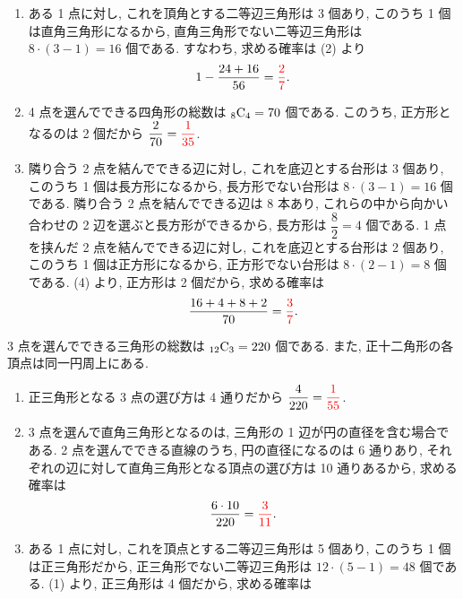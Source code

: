 \begin{qenumerate}
{\begin{enumerate}
{				\begin{align}
					\frac{4\cdot 6}{56} = \red{\frac{3}{7}}.
				\end{align}
			}
			\item{
				ある 1 点に対し, これを頂角とする二等辺三角形は 3 個あり, このうち 1 個は直角三角形になるから, 直角三角形でない二等辺三角形は $8\cdot (3 - 1) = 16$ 個である.
				すなわち, 求める確率は (2) より
				\begin{align}
					1 - \frac{24 + 16}{56} = \textcolor{red}{\frac{2}{7}}.
				\end{align}
			}
			\item{
				4 点を選んでできる四角形の総数は ${{}_{8}\mathrm{C}_{4}} = 70$ 個である.
				このうち, 正方形となるのは 2 個だから $\dfrac{2}{70} = \textcolor{red}{\dfrac{1}{35}}$.
			}
			\item{
				隣り合う 2 点を結んでできる辺に対し, これを底辺とする台形は 3 個あり, このうち 1 個は長方形になるから, 長方形でない台形は $8\cdot (3 - 1) = 16$ 個である.
				隣り合う 2 点を結んでできる辺は 8 本あり, これらの中から向かい合わせの 2 辺を選ぶと長方形ができるから, 長方形は $\dfrac{8}{2} = 4$ 個である.
				1 点を挟んだ 2 点を結んでできる辺に対し, これを底辺とする台形は 2 個あり, このうち 1 個は正方形になるから, 正方形でない台形は $8\cdot (2 - 1) = 8$ 個である.
				(4) より, 正方形は 2 個だから, 求める確率は
				\begin{align}
					\frac{16 + 4 + 8 + 2}{70} = \textcolor{red}{\frac{3}{7}}.
				\end{align}
			}
		\end{enumerate}
	}
	\item{
		3 点を選んでできる三角形の総数は ${{}_{12}\mathrm{C}_{3}} = 220$ 個である.
		また, 正十二角形の各頂点は同一円周上にある.
		\begin{enumerate}
			\item{
				正三角形となる 3 点の選び方は 4 通りだから $\dfrac{4}{220} = \textcolor{red}{\dfrac{1}{55}}$.
			}
			\item{
				3 点を選んで直角三角形となるのは, 三角形の 1 辺が円の直径を含む場合である.
				2 点を選んでできる直線のうち, 円の直径になるのは 6 通りあり, それぞれの辺に対して直角三角形となる頂点の選び方は 10 通りあるから, 求める確率は
				\begin{align}
					\frac{6\cdot 10}{220} = \textcolor{red}{\frac{3}{11}}.
				\end{align}
			}
			\item{
				ある 1 点に対し, これを頂点とする二等辺三角形は 5 個あり, このうち 1 個は正三角形だから, 正三角形でない二等辺三角形は $12\cdot (5 - 1) = 48$ 個である.
				(1) より, 正三角形は 4 個だから, 求める確率は
}
\end{enumerate}}
\end{qenumerate}
